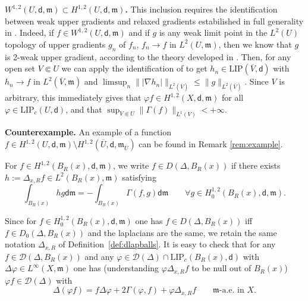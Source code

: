 \documentclass[a4paper,11pt,reqno]{article}
\numberwithin{equation}{section}
\theoremstyle{plain}
\theoremstyle{definition}
\theoremstyle{remark}
\let\altphi\phi
\let\phi\varphi
\let\varphi\altphi
\let\altphi\undefined
\newcommand{\dist}{\mathsf{d}}
\newcommand{\meas}{\mathfrak{m}}
\begin{document}
{\begin{remark}
\smallskip
\noindent
{\bf $W^{1,2}(U,\dist,\meas)\subset H^{1,2}(U,\dist,\meas)$.} This inclusion requires the identification between weak
upper gradients and relaxed gradients estabilished in full generality in \cite{AmbrosioGigliSavare13}. Indeed, if $f\in W^{1,2}(U,\dist,\meas)$
and if $g$ is any weak limit point in the $L^2(U)$ topology of upper gradients $g_n$ of $f_n$, $f_n\to f$ in $L^2(U,\meas)$,
then we know that $g$ is 2-weak upper gradient, according to the theory developed in \cite{Shanmugalingam}. Then, for any open
set $V\Subset U$ we can apply the identification of \cite{AmbrosioGigliSavare13} to get $h_n\in\mathrm{LIP}(\overline{V},\dist)$ with $h_n\to f$
in $L^2(\overline{V},\meas)$ and $\limsup_n\||\nabla h_n|\|_{L^2(\overline{V})}\leq \|g\|_{L^2(\overline{V})}$.
Since $V$ is arbitrary, this immediately gives that $\phi f\in H^{1,2}(X,\dist,\meas)$ for all $\phi\in\mathrm{LIP}_c(U,\dist)$,
and that $\sup_{V\Subset U}\|\Gamma(f)\|_{L^1(V)}<+\infty$.

\smallskip
\noindent
{\bf Counterexample.} An example of a function $f\in  H^{1,2}(U,\dist,\meas)\setminus H^{1,2}(\overline{U},\dist,\meas_{\overline{U}})$ can be found in Remark \ref{rem:example}.
\end{remark}



\begin{definition}
For $f \in H^{1, 2}(B_R(x), \dist, \meas)$, we write $f\in D(\Delta, B_R(x))$ if there exists 
$h:=\Delta_{x,R}f\in L^2(B_R(x),\meas)$  satisfying
$$
\int_{B_R(x)} hg\dist\meas=-\int_{B_R(x)} \Gamma(f, g) \dist\meas \qquad
\forall g\in H^{1,2}_0(B_R(x),\dist,\meas).
$$
\end{definition}

Since for $f \in H^{1, 2}_0(B_R(x), \dist, \meas)$ one has $f\in D(\Delta, B_R(x))$ iff
$f\in D_0(\Delta,B_R(x))$ and the laplacians are the same, we retain the same notation $\Delta_{x,R}$
of Definition~\ref{def:dlapballs}.
It is easy to check that for any $f \in \mathcal{D}(\Delta, B_R(x))$ and any 
$\phi \in \mathcal{D}(\Delta ) \cap \mathrm{LIP}_c(B_R(x), \dist)$ with $\Delta \phi \in L^{\infty}(X, \meas)$
one has (understanding $\phi\Delta_{x,R}f$ to be null out of $B_R(x)$)
$\phi f \in \mathcal{D}(\Delta )$ with
\begin{equation}\label{eq:local to global}
\Delta (\phi f)=f\Delta \phi +2\Gamma( \phi,f) +\phi \Delta_{x,R} f
\qquad\text{$\meas$-a.e. in $X$.}
\end{equation}

}
\end{document}
